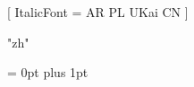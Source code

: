
\usepackage[a4paper, top=1.2cm, bottom=1.2cm, left=0.8cm, right=0.8cm]{geometry}

\renewcommand{\contentsname}{目录}



\usepackage{xeCJK}  %
\usepackage{fontspec} 

      [
        ItalicFont = {AR PL UKai CN}
      ]

\XeTeXlinebreaklocale "zh"

\linespread{1.1}\selectfont

\setlength{\parskip}{5pt}   

\XeTeXlinebreakskip = 0pt plus 1pt


\usepackage{fancyhdr}
\pagestyle{fancy}


